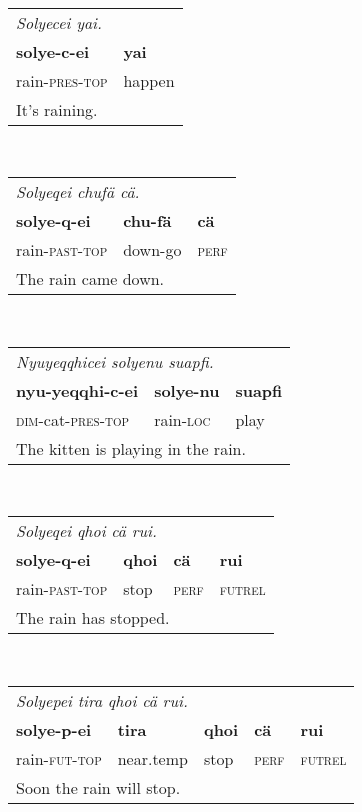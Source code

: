 \documentclass{article}
\begin{document}
\\[0.5cm]
\begin{tabular}{l l}
\multicolumn{2}{l}{\emph{Solyecei yai.}} \\
\textbf{solye-c-ei} & \textbf{yai} \\
rain-\textsc{pres-top} & happen \\
\multicolumn{2}{l}{It's raining.} \\
\end{tabular}
\\[0.5cm]
\begin{tabular}{l l l}
\multicolumn{3}{l}{\emph{Solyeqei chuf\"a c\"a.}} \\
\textbf{solye-q-ei} & \textbf{chu-f\"a} & \textbf{c\"a} \\
rain-\textsc{past-top} & down-go & \textsc{perf} \\
\multicolumn{3}{l}{The rain came down.} \\
\end{tabular}
\\[0.5cm]
\begin{tabular}{l l l}
\multicolumn{3}{l}{\emph{Nyuyeqqhicei solyenu suapfi.}} \\
\textbf{nyu-yeqqhi-c-ei} & \textbf{solye-nu} & \textbf{suapfi} \\
\textsc{dim}-cat-\textsc{pres-top} & rain-\textsc{loc} & play \\
\multicolumn{3}{l}{The kitten is playing in the rain.} \\
\end{tabular}
\\[0.5cm]
\begin{tabular}{l l l l}
\multicolumn{4}{l}{\emph{Solyeqei qhoi c\"a rui.}} \\
\textbf{solye-q-ei} & \textbf{qhoi} & \textbf{c\"a} & \textbf{rui} \\
rain-\textsc{past-top} & stop & \textsc{perf} & \textsc{futrel} \\
\multicolumn{4}{l}{The rain has stopped.} \\
\end{tabular}
\\[0.5cm]
\begin{tabular}{l l l l l}
\multicolumn{5}{l}{\emph{Solyepei tira qhoi c\"a rui.}} \\
\textbf{solye-p-ei} & \textbf{tira} & \textbf{qhoi} & \textbf{c\"a} & \textbf{rui} \\
rain-\textsc{fut-top} & near.temp & stop & \textsc{perf} & \textsc{futrel} \\
\multicolumn{5}{l}{Soon the rain will stop.} \\
\end{tabular}
\end{document}
